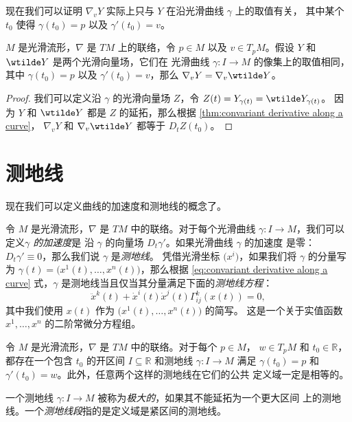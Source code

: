 \documentclass[fontset=none]{Notes}
\begin{document}
现在我们可以证明 $\nabla_vY$ 实际上只与 $Y$ 在沿光滑曲线 $\gamma$ 上的取值有关，
其中某个 $t_0$ 使得 $\gamma(t_0)=p$ 以及 $\gamma'(t_0)=v$。

\begin{proposition}
  $M$ 是光滑流形，$\nabla$ 是 $TM$ 上的联络，令 $p\in M$ 以及 
  $v\in T_pM$。假设 $Y$ 和 $\wtilde Y$ 是两个光滑向量场，它们在
  光滑曲线 $\gamma:I\to M$ 的像集上的取值相同，其中
  $\gamma(t_0)=p$ 以及 $\gamma'(t_0)=v$，那么 $\nabla_vY=\nabla_v\wtilde Y$。
\end{proposition}
\begin{proof}
  我们可以定义沿 $\gamma$ 的光滑向量场 $Z$，令 $Z(t)=Y_{\gamma(t)}=\wtilde Y_{\gamma(t)}$。
  因为 $Y$ 和 $\wtilde Y$ 都是 $Z$ 的延拓，那么根据
  \autoref{thm:convariant derivative along a curve}，
  $\nabla_vY$ 和 $\nabla_v\wtilde Y$ 都等于 $D_tZ(t_0)$。
\end{proof}

\section{测地线}

现在我们可以定义曲线的加速度和测地线的概念了。

令 $M$ 是光滑流形，$\nabla$ 是 $TM$ 中的联络。对于每个光滑曲线
$\gamma:I\to M$，我们可以定义\emph{$\gamma$ 的加速度}是
沿 $\gamma$ 的向量场 $D_t\gamma'$。如果光滑曲线 $\gamma$ 的加速度
是零：$D_t\gamma'\equiv 0$，那么我们说 $\gamma$ 是\emph{测地线}。
凭借光滑坐标 $\bigl(x^i\bigr)$，如果我们将 $\gamma$ 的分量写为
$\gamma(t)=\bigl(x^1(t),\dots,x^n(t)\bigr)$，那么根据 \eqref{eq:convariant derivative along a curve}
式，$\gamma$ 是测地线当且仅当其分量满足下面的\emph{测地线方程}：
\begin{equation}\label{eq:geodesic curve equation}
  \ddot{x}^k(t)+\dot x^i(t)\dot x^j(t)\Gamma_{ij}^k(x(t))=0,
\end{equation}
其中我们使用 $x(t)$ 作为 $\bigl(x^1(t),\dots,x^n(t)\bigr)$ 的简写。
这是一个关于实值函数 $x^1,\dots,x^n$ 的二阶常微分方程组。

\begin{theorem}[测地线的存在唯一性]
  令 $M$ 是光滑流形，$\nabla$ 是 $TM$ 中的联络。对于每个 $p\in M$，
  $w\in T_pM$ 和 $t_0\in \mathbb{R}$，都存在一个包含 $t_0$
  的开区间 $I\subseteq \mathbb{R}$ 和测地线 $\gamma:I\to M$ 满足
  $\gamma(t_0)=p$ 和 $\gamma'(t_0)=w$。此外，任意两个这样的测地线在它们的公共
  定义域一定是相等的。
\end{theorem}

一个测地线 $\gamma:I\to M$ 被称为\emph{极大的}，如果其不能延拓为一个更大区间
上的测地线。一个\emph{测地线段}指的是定义域是紧区间的测地线。
\end{document}
